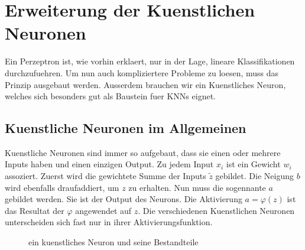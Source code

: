 \section{Erweiterung der Kuenstlichen Neuronen}\label{sec:kuenstlicheNeuronen}
Ein Perzeptron ist, wie vorhin erklaert, nur in der Lage, lineare Klassifikationen
durchzufuehren. Um nun auch kompliziertere Probleme zu loesen, muss das Prinzip
ausgebaut werden. Ausserdem brauchen wir ein Kuenstliches Neuron, welches sich
besonders gut als Baustein fuer KNNs eignet.


\subsection{Kuenstliche Neuronen im Allgemeinen}
Kuenstliche Neuronen sind immer so aufgebaut, dass sie einen oder mehrere Inputs
haben und einen einzigen Output. Zu jedem Input $x_i$ ist ein Gewicht
$w_{i}$ assoziert. Zuerst wird die gewichtete Summe der Inputs $\tilde{z}$ gebildet.
Die Neigung $b$ wird ebenfalls draufaddiert, um $z$ zu erhalten. Nun muss
die sogennante  $a$ gebildet werden. Sie ist der Output des Neurons.
Die Aktivierung $a = \varphi(z)$ ist das Resultat der  $\varphi$ angewendet
auf $z$. Die verschiedenen Kuenstlichen Neuronen unterscheiden
sich fast nur in ihrer Aktivierungsfunktion.
\\
\begin{figure}[h!]

  \caption{ein kuenstliches Neuron und seine Bestandteile}
\end{figure}
\\

